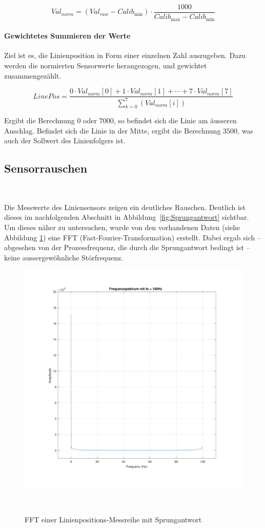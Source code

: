 \documentclass[main.tex]{subfiles} %
\begin{document}
\[
    Val_{norm} = (Val_{raw} - Calib_{\min}) \cdot \frac{1000}{Calib_{\max} - Calib_{\min}}
\]

\paragraph{Gewichtetes Summieren der Werte}
Ziel ist es, die Linienposition in Form einer einzelnen Zahl auszugeben. Dazu
werden die normierten Sensorwerte herangezogen, und gewichtet zusammengezählt.

\[
    LinePos = \frac{0 \cdot Val_{norm}[0] + 1 \cdot Val_{norm}[1] + \cdots + 7 \cdot Val_{norm}[7]}{\sum_{k=0}^{7}(Val_{norm}[i])}
\]

Ergibt die Berechnung $0$ oder $7000$, so befindet sich die Linie am äusseren
Anschlag. Befindet sich die Linie in der Mitte, ergibt die Berechnung $3500$,
was auch der Sollwert des Linienfolgers ist.

\subsection*{Sensorrauschen}~\label{apdx:Liniensensor_rauschen}

Die Messwerte des Liniensensors zeigen ein deutliches Rauschen. Deutlich ist
dieses im nachfolgenden Abschnitt in Abbildung~\ref{fig:Sprungantwort}
sichtbar. Um dieses näher zu untersuchen, wurde von den vorhandenen Daten
(siehe Abbildung \ref{fig:FFT_START}) eine FFT (Fast-Fourier-Transformation)
erstellt. Dabei ergab sich – abgesehen von der Prozessfrequenz, die durch die
Sprungantwort bedingt ist – keine aussergewöhnliche Störfrequenz.

\begin{figure}[H]
    \centering
    \includegraphics[width=0.5\linewidth]{fig_Parametrierung_Linienfolgeregler/FFT_START.pdf}
    \caption{FFT einer Linienpositions-Messreihe mit Sprungantwort}~\label{fig:FFT_START}
\end{figure}
\end{document}
